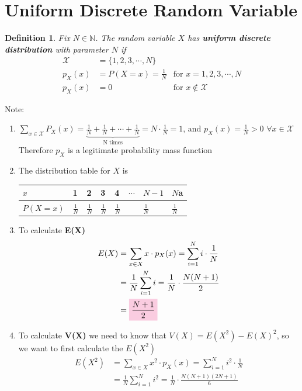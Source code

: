 \documentclass[11pt,oneside]{book}
\theoremstyle{newStyle}
\newtheorem{defn}[thm]{Definition}
\newcommand{\N}{\mathbb{N}}
\newcommand{\X}{\mathcal{X}}
\newcommand{\note}{\color{red}Note: \color{black}}
\begin{document}
\section[Uniform Discrete Random Variable]{Uniform Discrete Random Variable}
\begin{defn}
Fix $N\in \N$. The random variable $X$ has \textbf{uniform discrete distribution} with parameter $N$ if \begin{align*}
\X&=\{1,2,3,\cdots,N\}\\
p_X(x)&=P(X=x)=\frac{1}{N} &\text{for }x=1,2,3,\cdots,N\\
p_X(x)&=0&\text{for }x\notin \X
\end{align*}
\end{defn}
\note \begin{enumerate}
\item $\sum_{x\in \X}P_X(x)=\underbrace{\frac{1}{N}+\frac{1}{N}+\cdots+\frac{1}{N}}_{\text{N times}}=N\cdot \frac{1}{N}=1$, and $p_X(x)=\frac{1}{N}>0$ $\forall x\in \X$\\
Therefore $p_X$ is a legitimate probability mass function
\item  The distribution table for $X$ is \begin{center}
\begin{tabular}{|l|l|l|l|l|l|l|l|}
\hline
$x$      & 1             & 2             & 3             & 4             & $\cdots$ & $N-1$         & $N$a          \\ \hline
$P(X=x)$ & $\frac{1}{N}$ & $\frac{1}{N}$ & $\frac{1}{N}$ & $\frac{1}{N}$ &          & $\frac{1}{N}$ & $\frac{1}{N}$ \\ \hline
\end{tabular}
\end{center}
\item
To calculate \textbf{E(X)}\begin{align*}
E(X)&=\sum_{x\in X}x\cdot p_X(x)=\sum_{i=1}^{N}i\cdot \frac{1}{N}\\
&=\frac{1}{N}\sum_{i=1}^{N}i=\frac{1}{N}\cdot \frac{N(N+1)}{2}\\
&=\text{\colorbox{pink}{$\frac{N+1}{2}$}}
\end{align*}
\item To calculate \textbf{V(X)} we need to know that $V(X)=E(X^2)-E(X)^2$, so we want to first calculate the $E(X^2)$\begin{align*}
E(X^2)&=\sum_{x\in X}x^2\cdot p_X(x)=\sum_{i=1}^{N}i^2\cdot \frac{1}{N}\\
&=\frac{1}{N}\sum_{i=1}^{N}i^2=\frac{1}{N}\cdot \frac{N(N+1)(2N+1)}{6}\\

\end{align*}
\end{enumerate}
\end{document}
